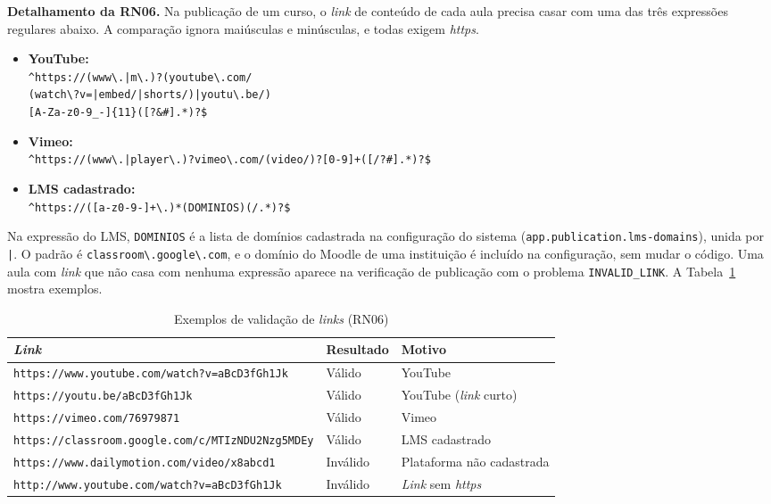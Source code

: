 \textbf{Detalhamento da RN06.} Na publicação de um curso, o \textit{link} de conteúdo de cada aula precisa casar com uma das três expressões regulares abaixo. A comparação ignora maiúsculas e minúsculas, e todas exigem \textit{https}.

\begin{itemize}
    \item \textbf{YouTube:}\\ {\small \texttt{\textasciicircum{}https://(www\textbackslash{}.|m\textbackslash{}.)?(youtube\textbackslash{}.com/}\\
    \texttt{(watch\textbackslash{}?v=|embed/|shorts/)|youtu\textbackslash{}.be/)}\\
    \texttt{[A-Za-z0-9\_-]\{11\}([?\&\#].*)?\$}}
    \item \textbf{Vimeo:}\\ {\small \texttt{\textasciicircum{}https://(www\textbackslash{}.|player\textbackslash{}.)?vimeo\textbackslash{}.com/(video/)?[0-9]+([/?\#].*)?\$}}
    \item \textbf{LMS cadastrado:}\\ {\small \texttt{\textasciicircum{}https://([a-z0-9-]+\textbackslash{}.)*(DOMINIOS)(/.*)?\$}}
\end{itemize}

Na expressão do LMS, \texttt{DOMINIOS} é a lista de domínios cadastrada na configuração do sistema (\texttt{app.publication.lms-domains}), unida por \texttt{|}. O padrão é \texttt{classroom\textbackslash.google\textbackslash.com}, e o domínio do Moodle de uma instituição é incluído na configuração, sem mudar o código. Uma aula com \textit{link} que não casa com nenhuma expressão aparece na verificação de publicação com o problema \texttt{INVALID\_LINK}. A Tabela~\ref{tab:rn06} mostra exemplos.

\begin{table}[H]
\centering
\small
\caption{Exemplos de validação de \textit{links} (RN06)}
\label{tab:rn06}
\footnotesize
\begin{tabular}{|>{\raggedright\arraybackslash}p{9.6cm}|l|>{\raggedright\arraybackslash}p{2.6cm}|}
\hline
\textbf{\textit{Link}} & \textbf{Resultado} & \textbf{Motivo} \\
\hline
\texttt{https://www.youtube.com/watch?v=aBcD3fGh1Jk} & Válido & YouTube \\
\hline
\texttt{https://youtu.be/aBcD3fGh1Jk} & Válido & YouTube (\textit{link} curto) \\
\hline
\texttt{https://vimeo.com/76979871} & Válido & Vimeo \\
\hline
\texttt{https://classroom.google.com/c/MTIzNDU2Nzg5MDEy} & Válido & LMS cadastrado \\
\hline
\texttt{https://www.dailymotion.com/video/x8abcd1} & Inválido & Plataforma não cadastrada \\
\hline
\texttt{http://www.youtube.com/watch?v=aBcD3fGh1Jk} & Inválido & \textit{Link} sem \textit{https} \\
\hline
\end{tabular}
\end{table}

